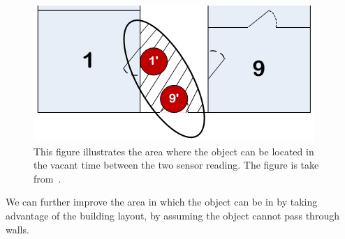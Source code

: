 \begin{figure}%
\centering
\includegraphics[width=0.8\columnwidth]{images/speed2.png}%
\caption{This figure illustrates the area where the object can be located in the vacant time between the two sensor reading. The figure is take from~\cite{Jensen:2009:GMB:1590953.1591000}.}%
\label{fig:speed2}%
\end{figure}
We can further improve the area in which the object can be in by taking advantage of the building layout, by assuming the object cannot pass through walls. 




